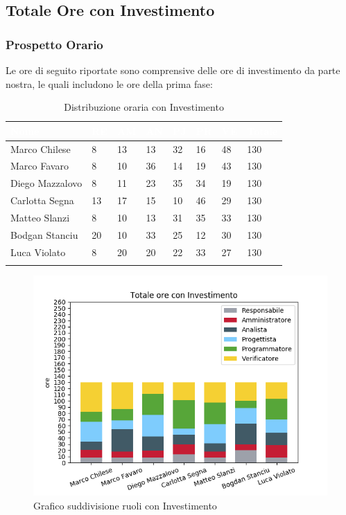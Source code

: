 \newpage
\subsection{Totale Ore con Investimento}
\label{PTI}
\subsubsection{Prospetto Orario}

Le ore di seguito riportate sono comprensive delle ore di investimento da parte nostra, le quali includono le ore della prima fase:

\begin{longtable}{|C{.30\textwidth}|C{.06\textwidth}|C{.06\textwidth}|C{.06\textwidth} | C{.06\textwidth}| C{.06\textwidth} | C{.06\textwidth} | C{.10\textwidth} |}
\hline
{}	\textbf{\textcolor{white}{Nome}} & \textbf{\textcolor{white}{RE}} & \textbf{\textcolor{white}{AM}} & \textbf{\textcolor{white}{AN}} & \textbf{\textcolor{white}{PJ}} & \textbf{\textcolor{white}{PR}} & \textbf{\textcolor{white}{VE}} & \textbf{\textcolor{white}{Totale}}\\
\hline 
Marco Chilese & 8 & 13 & 13 & 32 & 16 & 48 & 130\\
\hline
{}Marco Favaro & 8 & 10 & 36 & 14 & 19 & 43 & 130\\
\hline
Diego Mazzalovo & 8 & 11 & 23 & 35 & 34 & 19 & 130\\
\hline
{}Carlotta Segna & 13 & 17 & 15 & 10 & 46 & 29 & 130\\
\hline
Matteo Slanzi & 8 & 10 & 13 & 31 & 35 & 33 & 130\\
\hline
{}Bodgan Stanciu & 20 & 10 & 33 & 25 & 12 & 30 & 130\\
\hline
Luca Violato & 8 & 20 & 20 & 22 & 33 & 27 & 130 \\
\hline


\caption{Distribuzione oraria con Investimento}
\label{Distribuzione oraria delle ore con investimento}
\end{longtable}

\begin{figure}[H]
	\centering
  		\includegraphics[width=0.8\linewidth]{./images/fig_toi.png}
  		\caption{Grafico suddivisione ruoli con Investimento}
  		\label{fig:grafico suddivione ruoli con investimento}
\end{figure}

